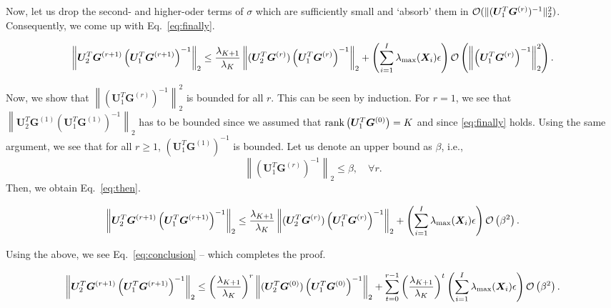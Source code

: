 \documentclass[10pt,journal]{IEEEtran}
\newcommand{\G}{\boldsymbol{G}}
\newcommand{\X}{\boldsymbol{X}}
\newcommand{\U}{\boldsymbol{U}}
\begin{document}
Now, let us drop the second- and higher-oder terms of $\sigma$ which are sufficiently small and `absorb' them in ${\cal O}(\|(\U_1^T\G^{(r)})^{-1}\|_2^2)$. Consequently, we come up with Eq.~\eqref{eq:finally}.
\begin{figure}[t]
\begin{align}\label{eq:finally}
\left\| \U_2^T\G^{(r+1)}\left( \U_1^T\G^{(r+1)} \right)^{-1}  \right\|_2 
\leq \frac{\lambda_{K+1}}{\lambda_K}\left\|( \U_2^T\G^{(r)} )\left( \U_1^T\G^{(r)}\right)^{-1} \right\|_2 +\left(\sum_{i=1}^I\lambda_{\max}(\X_i)\epsilon\right) {\cal O}\left( \left\|\left(\U_1^T\G^{(r)}\right)^{-1}\right\|_2^2\right).
\end{align}
\hrulefill
\end{figure}
Now, we show that $\left\|\left(\U_1^T\G^{(r)}\right)^{-1}\right\|_2^2$ is bounded for all $r$.
This can be seen by induction.
For $r=1$, we see that $\left\| \U_2^T\G^{(1)}\left( \U_1^T\G^{(1)} \right)^{-1}  \right\|_2$
has to be bounded since we assumed that ${\rm rank}\left(\U_1^T\G^{(0)}\right) = K$ and since
\eqref{eq:finally} holds.
Using the same argument, we see that for all $r\geq 1$, $\left( \U_1^T\G^{(1)} \right)^{-1}$ is bounded.
Let us denote an upper bound as $\beta$, i.e.,
\[\left\|\left( \U_1^T\G^{(r)} \right)^{-1}\right\|_2\leq \beta,\quad \forall r.\]
Then, we obtain Eq.~\eqref{eq:then}.
\begin{figure}[t!]
\begin{align}\label{eq:then}
\left\| \U_2^T\G^{(r+1)}\left( \U_1^T\G^{(r+1)} \right)^{-1}  \right\|_2
\leq \frac{\lambda_{K+1}}{\lambda_K}\left\|( \U_2^T\G^{(r)} )\left( \U_1^T\G^{(r)}\right)^{-1} \right\|_2 +\left(\sum_{i=1}^I\lambda_{\max}(\X_i)\epsilon\right) {\cal O}\left( \beta^2\right).
\end{align}
\hrulefill
\end{figure}
Using the above, we see Eq.~\eqref{eq:conclusion}  -- which completes the proof.
\begin{figure}[t!]
\begin{align}\label{eq:conclusion}
\left\| \U_2^T\G^{(r+1)}\left( \U_1^T\G^{(r+1)} \right)^{-1}  \right\|_2
\leq \left(\frac{\lambda_{K+1}}{\lambda_K}\right)^r \left\|( \U_2^T\G^{(0)} )\left( \U_1^T\G^{(0)}\right)^{-1} \right\|_2 +\sum_{t=0}^{r-1} \left(\frac{\lambda_{K+1}}{\lambda_K}\right)^t \left(\sum_{i=1}^I\lambda_{\max}(\X_i)\epsilon\right) {\cal O}\left( \beta^2\right).
\end{align}
\hrulefill
\end{figure}







%


\end{document}
